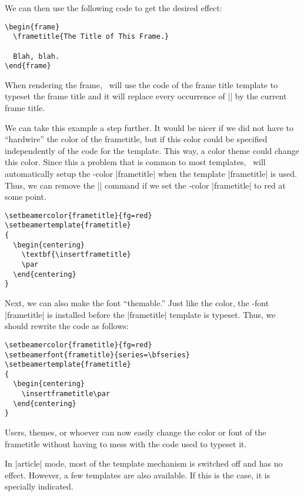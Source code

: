 We can then use the following code to get the desired effect:
\begin{verbatim}
\begin{frame}
  \frametitle{The Title of This Frame.}

  Blah, blah.
\end{frame}
\end{verbatim}
When rendering the frame, \beamer\ will use the code of the
frame title template to typeset the frame title and it will replace
every occurrence of |\insertframetitle| by the current frame
title.

We can take this example a step further. It would be nicer if we did
not have to ``hardwire'' the color of the frametitle, but if this
color could be specified independently of the code for the
template. This way, a color theme could change this color. Since this
a problem that is common to most templates, \beamer\ will
automatically setup the \beamer-color |frametitle| when the template
|frametitle| is used. Thus, we can remove the |\color{red}| command if
we set the \beamer-color |frametitle| to red at some point.
\begin{verbatim}
\setbeamercolor{frametitle}{fg=red}
\setbeamertemplate{frametitle}
{
  \begin{centering}
    \textbf{\insertframetitle}
    \par
  \end{centering}
}
\end{verbatim}
Next, we can also make the font ``themable.'' Just like the color, the
\beamer-font |frametitle| is installed before the |frametitle|
template is typeset. Thus, we should rewrite the code as follows:
\begin{verbatim}
\setbeamercolor{frametitle}{fg=red}
\setbeamerfont{frametitle}{series=\bfseries}
\setbeamertemplate{frametitle}
{
  \begin{centering}
    \insertframetitle\par
  \end{centering}
}
\end{verbatim}
Users, themes, or whoever can now easily change the color or font of
the frametitle without having to mess with the code used to typeset
it.

\articlenote
In |article| mode, most of the template mechanism is switched off and
has no effect. However, a few templates are also available. If this is
the case, it is specially indicated.
\smallskip

